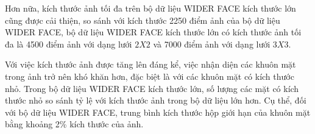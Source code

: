 {    \noindent
    Hơn nữa, kích thước ảnh tối đa trên bộ dữ liệu WIDER FACE kích thước lớn cũng được cải thiện, so sánh với kích thước 2250 điểm ảnh của bộ dữ liệu WIDER FACE, bộ dữ liệu WIDER FACE kích thước lớn có kích thước ảnh tối đa là 4500 điểm ảnh với dạng lưới $2 X 2$ và 7000 điểm ảnh với dạng lưới $3 X 3$.

    \noindent
    Với việc kích thước ảnh được tăng lên đáng kể, việc nhận diện các khuôn mặt trong ảnh trở nên khó khăn hơn, đặc biệt là với các khuôn mặt có kích thước nhỏ.
    Trong bộ dữ liệu WIDER FACE kích thước lớn, số lượng các mặt có kích thước nhỏ so sánh tỷ lệ với kích thước ảnh trong bộ dữ liệu lớn hơn.
    Cụ thể, đối với bộ dữ liệu WIDER FACE, trung bình kích thước hộp giới hạn của khuôn mặt bằng khoảng 2\% kích thước của ảnh.

    \begin{figure}[H]
        \centering

\end{figure}}
